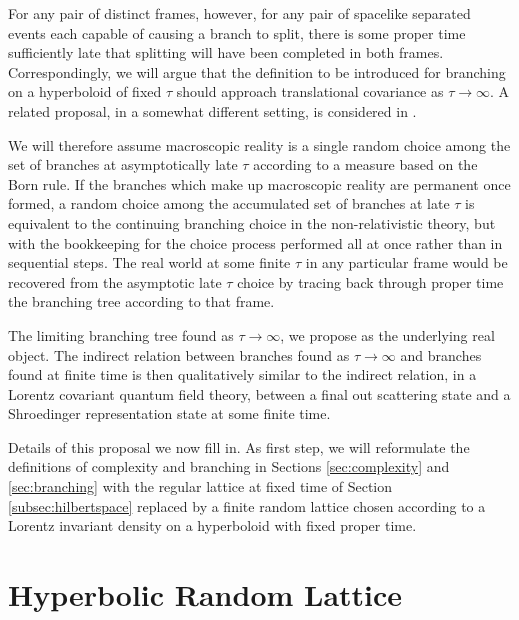 \documentclass[12pt,amsmath,amssymb,onecolumn]{revtex4-2}
\begin{document}
For any pair of distinct frames, however,
for any pair of spacelike separated events 
each capable of causing a branch to split,
there is some proper time sufficiently late
that splitting will have been completed in both frames.
Correspondingly,
we will argue that the definition
to be introduced for branching
on a hyperboloid of fixed $\tau$
should approach translational covariance as 
$\tau \rightarrow \infty$.
A related proposal, in a somewhat different setting,
is considered in \cite{Kent, Kent1, Kent2}.



We will therefore assume
macroscopic reality is a single random choice 
among the set of branches at asymptotically late $\tau$
according to a measure based on the Born rule.
If the branches which make up macroscopic reality
are permanent once formed, a random
choice among the accumulated set of branches
at late $\tau$ is equivalent to the continuing 
branching choice in the non-relativistic theory,
but with the bookkeeping for the choice process performed all 
at once rather than in sequential steps.
The real world at some finite $\tau$ in any particular frame
would be recovered from the asymptotic late $\tau$ choice
by tracing back through proper time the branching tree according to that frame.


The limiting  branching tree found as $\tau \rightarrow \infty$,
we propose as the underlying real object.
The indirect relation between branches found
as $\tau \rightarrow \infty$ and branches
found at finite time
is then qualitatively similar to the indirect relation,
in a Lorentz covariant quantum field theory,
between a final out scattering state and
a Shroedinger representation state
at some finite time.

Details of this proposal we now fill in.
As first step, we will reformulate
the definitions of complexity and branching in Sections 
\ref{sec:complexity} and \ref{sec:branching} with the
regular lattice at fixed time of Section \ref{subsec:hilbertspace}
replaced by a finite random lattice 
chosen according to a Lorentz invariant density
on a hyperboloid with fixed proper time.


\section{\label{subsec:hyperboloid} Hyperbolic Random Lattice}
\end{document}
